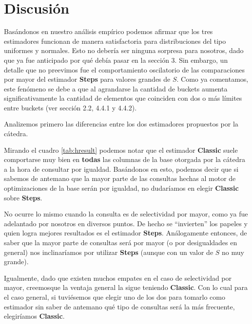 \section{Discusión}
Basándonos en nuestro análisis empírico podemos afirmar que los tres estimadores funcionan de manera satisfactoria para distribuciones del tipo uniformes y normales. Esto no debería ser ninguna sorpresa para nosotros, dado que ya fue anticipado por qué debía pasar en la sección 3. Sin embargo, un detalle que no preevimos fue el comportamiento oscilatorio de las comparaciones por mayor del estimador \textbf{Steps} para valores grandes de $S$. Como ya comentamos, este fenómeno se debe a que al agrandarse la cantidad de buckets aumenta significativamente la cantidad de elementos que coinciden con dos o más límites entre buckets (ver sección 2.2, 4.4.1 y 4.4.2).

Analizemos primero las diferencias entre los dos estimadores propuestos por la cátedra.

Mirando el cuadro \ref{tab:hresult} podemos notar que el estimador \textbf{Classic} suele comportarse muy bien en \textbf{todas} las columnas de la base otorgada por la cátedra a la hora de consultar por igualdad. Basándonos en esto, podemos decir que si sabemos de antemano que la mayor parte de las consultas hechas al motor de optimizaciones de la base serán por igualdad, no dudaríamos en elegir \textbf{Classic} sobre \textbf{Steps}.

No ocurre lo mismo cuando la consulta es de selectividad por mayor, como ya fue adelantado por nosotros en diversos puntos. De hecho se ``invierten'' los papeles y quien logra mejores resultados es el estimador \textbf{Steps}. Análogamente entonces, de saber que la mayor parte de consultas será por mayor (o por desigualdades en general) nos inclinaríamos por utilizar \textbf{Steps} (aunque con un valor de $S$ no muy grande).

Igualmente, dado que existen muchos empates en el caso de selectividad por mayor,  creemosque la ventaja general la sigue teniendo \textbf{Classic}. Con lo cual para el caso general, si tuviésemos que elegir uno de los dos para tomarlo como estimador sin saber de antemano qué tipo de consultas será la más frecuente, elegiríamos \textbf{Classic}.

